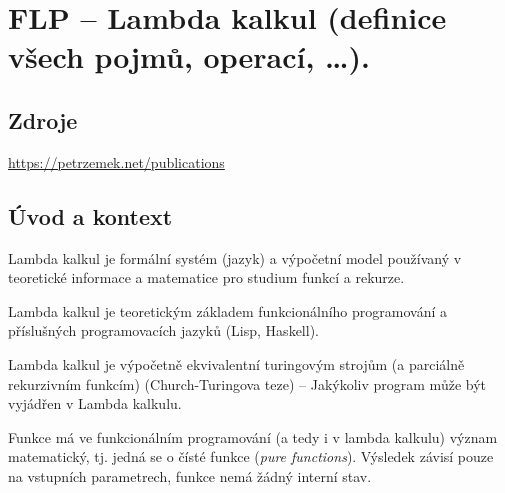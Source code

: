 

\graphicspath{{flp/lambda_kalkul/figures}}


\chapter{FLP -- Lambda kalkul (definice všech pojmů, operací, \dots).}


\section{Zdroje}

\begin{compactitem}
    \item {}
    \item {}
    \item {}
    \item \url{https://petrzemek.net/publications}
\end{compactitem}


\section{Úvod a kontext}

\begin{compactitem}
    \item Lambda kalkul je formální systém (jazyk) a výpočetní model používaný v teoretické informace a matematice pro studium funkcí a rekurze.

    \item Lambda kalkul je teoretickým základem funkcionálního programování a příslušných programovacích jazyků (Lisp, Haskell).

    \item Lambda kalkul je výpočetně ekvivalentní turingovým strojům (a parciálně rekurzivním funkcím) (Church-Turingova teze) -- Jakýkoliv program může být vyjádřen v Lambda kalkulu.

    \item Funkce má ve funkcionálním programování (a tedy i v lambda kalkulu) význam matematický, tj. jedná se o čísté funkce (\textit{pure functions}). Výsledek závisí pouze na vstupních parametrech, funkce nemá žádný interní stav.

\end{compactitem}

